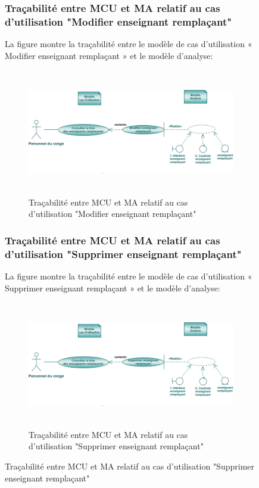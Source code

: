 \documentclass[12 pt]{report}
\begin{document}
\begin{figure}[h]
\begin{center}
\subsubsection{Traçabilité entre MCU et MA relatif au  cas d’utilisation "Modifier enseignant remplaçant" }
La figure  montre la traçabilité entre le modèle de  cas d’utilisation « Modifier enseignant remplaçant » et le modèle d’analyse:
\begin{figure}[h]
\begin{center}
\includegraphics[width= 12cm , height =5.5cm]{mod_rem.PNG}
\caption{Traçabilité entre MCU et MA relatif au  cas d’utilisation "Modifier enseignant remplaçant"}
\end{center}
\end{figure}
\subsubsection{Traçabilité entre MCU et MA relatif au  cas d’utilisation "Supprimer enseignant remplaçant" }
La figure  montre la traçabilité entre le modèle de  cas d’utilisation « Supprimer enseignant remplaçant » et le modèle d’analyse:
\begin{figure}[h]
\begin{center}
\includegraphics[width= 12cm , height =5.5cm]{sup_rem.PNG}
\caption{Traçabilité entre MCU et MA relatif au  cas d’utilisation "Supprimer enseignant remplaçant"}
\end{center}
\end{figure}

\end{center}
\end{figure}
\end{document}
